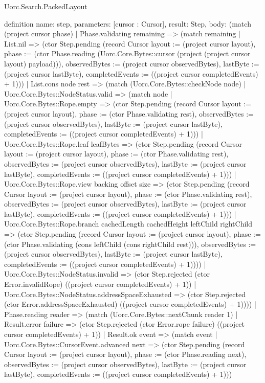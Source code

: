 \begin{lexlean}{Uorc.Search.PackedLayout}
\begin{semanticmodule}
definition{
  name: step,
  parameters: [cursor : Cursor],
  result: Step,
  body: (match (project cursor phase)
    | Phase.validating remaining => (match remaining
      | List.nil => (ctor Step.pending (record Cursor {layout := (project cursor layout), phase := (ctor Phase.reading (Uorc.Core.Bytes::cursor (project (project cursor layout) payload))), observedBytes := (project cursor observedBytes), lastByte := (project cursor lastByte), completedEvents := ((project cursor completedEvents) + 1)}))
      | List.cons node rest => (match (Uorc.Core.Bytes::checkNode node)
        | Uorc.Core.Bytes::NodeStatus.valid => (match node
          | Uorc.Core.Bytes::Rope.empty => (ctor Step.pending (record Cursor {layout := (project cursor layout), phase := (ctor Phase.validating rest), observedBytes := (project cursor observedBytes), lastByte := (project cursor lastByte), completedEvents := ((project cursor completedEvents) + 1)}))
          | Uorc.Core.Bytes::Rope.leaf leafBytes => (ctor Step.pending (record Cursor {layout := (project cursor layout), phase := (ctor Phase.validating rest), observedBytes := (project cursor observedBytes), lastByte := (project cursor lastByte), completedEvents := ((project cursor completedEvents) + 1)}))
          | Uorc.Core.Bytes::Rope.view backing offset size => (ctor Step.pending (record Cursor {layout := (project cursor layout), phase := (ctor Phase.validating rest), observedBytes := (project cursor observedBytes), lastByte := (project cursor lastByte), completedEvents := ((project cursor completedEvents) + 1)}))
          | Uorc.Core.Bytes::Rope.branch cachedLength cachedHeight leftChild rightChild => (ctor Step.pending (record Cursor {layout := (project cursor layout), phase := (ctor Phase.validating (cons leftChild (cons rightChild rest))), observedBytes := (project cursor observedBytes), lastByte := (project cursor lastByte), completedEvents := ((project cursor completedEvents) + 1)})))
        | Uorc.Core.Bytes::NodeStatus.invalid => (ctor Step.rejected (ctor Error.invalidRope) ((project cursor completedEvents) + 1))
        | Uorc.Core.Bytes::NodeStatus.addressSpaceExhausted => (ctor Step.rejected (ctor Error.addressSpaceExhausted) ((project cursor completedEvents) + 1))))
    | Phase.reading reader => (match (Uorc.Core.Bytes::nextChunk reader 1)
      | Result.error failure => (ctor Step.rejected (ctor Error.rope failure) ((project cursor completedEvents) + 1))
      | Result.ok event => (match event
        | Uorc.Core.Bytes::CursorEvent.advanced next => (ctor Step.pending (record Cursor {layout := (project cursor layout), phase := (ctor Phase.reading next), observedBytes := (project cursor observedBytes), lastByte := (project cursor lastByte), completedEvents := ((project cursor completedEvents) + 1)}))
}
\end{semanticmodule}
\end{lexlean}
